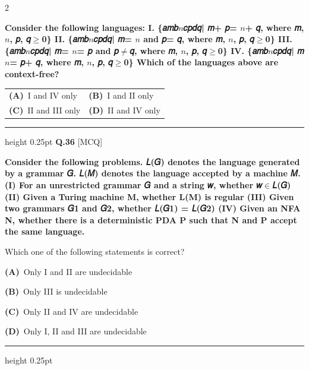 \documentclass[a4paper,10pt,twoside]{article}
\begin{document}
\begin{multicols}{2}
\par\vspace{2pt}
{\bfseries Consider the following languages:
I. \{𝑎𝑚𝑏$n$𝑐𝑝𝑑𝑞| 𝑚+ 𝑝= $n$+ 𝑞, where 𝑚, $n$, 𝑝, 𝑞$\ge$0\}
II. \{𝑎𝑚𝑏$n$𝑐𝑝𝑑𝑞| 𝑚= $n$ and 𝑝= 𝑞, where 𝑚, $n$, 𝑝, 𝑞$\ge$0\}
III. \{𝑎𝑚𝑏$n$𝑐𝑝𝑑𝑞| 𝑚= $n$= 𝑝 and 𝑝$\ne$𝑞, where 𝑚, $n$, 𝑝, 𝑞$\ge$0\}
IV. \{𝑎𝑚𝑏$n$𝑐𝑝𝑑𝑞| 𝑚$n$= 𝑝+ 𝑞, where 𝑚, $n$, 𝑝, 𝑞$\ge$0\}
Which of the languages above are context-free? \par}
\par\vspace{2pt}\noindent
\begin{tabular*}{\columnwidth}{@{\extracolsep{\fill}}p{}p{}@{}}
\textbf{(A)}~I and IV only & \textbf{(B)}~I and II only \\
\addlinespace[2pt]
\textbf{(C)}~II and III only & \textbf{(D)}~II and IV only
\end{tabular*}
\par\vspace{6pt}\hrule height 0.25pt\vspace{6pt}
\noindent\textbf{Q.36} \hfill {\footnotesize\textsf{[MCQ]}}
\par\vspace{2pt}
{\bfseries Consider the following problems. 𝐿(𝐺) denotes the language generated by a grammar 𝐺.
𝐿(𝑀) denotes the language accepted by a machine 𝑀.
(I)
For an unrestricted grammar 𝐺 and a string 𝑤, whether 𝑤$\in$𝐿(𝐺)
(II)
Given a Turing machine M, whether L(M) is regular
(III)
Given two grammars 𝐺1 and 𝐺2, whether 𝐿(𝐺1) = 𝐿(𝐺2)
(IV)
Given an NFA N, whether there is a deterministic PDA P such that N and P
accept the same language.
\par\smallskip
Which one of the following statements is correct? \par}
\par\vspace{2pt}\noindent
\textbf{(A)}~Only I and II are undecidable\par\vspace{2pt}\noindent
\textbf{(B)}~Only III is undecidable\par\vspace{2pt}\noindent
\textbf{(C)}~Only II and IV are undecidable\par\vspace{2pt}\noindent
\textbf{(D)}~Only I, II and III are undecidable
\par\vspace{6pt}\hrule height 0.25pt\vspace{6pt}

\end{multicols}
\end{document}
